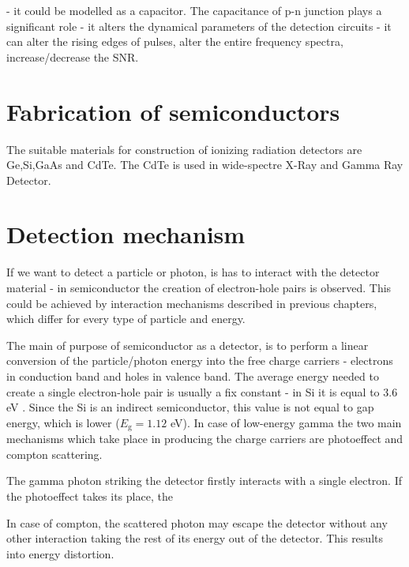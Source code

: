 - it could be modelled as a capacitor. The capacitance of p-n junction plays a significant role - it alters the dynamical parameters of the detection circuits - it can alter the rising edges of pulses, alter the entire frequency spectra, increase/decrease the SNR.

\section{Fabrication of semiconductors}



The suitable materials for construction of ionizing radiation detectors are Ge,Si,GaAs and CdTe. The CdTe is used in wide-spectre X-Ray and Gamma Ray Detector.

\section{Detection mechanism}

\par
If we want to detect a particle or photon, is has to interact with the detector material - in semiconductor the creation of electron-hole pairs is observed. This could be achieved by interaction mechanisms described in previous chapters, which differ for every type of particle and energy. 

\par
The main of purpose of semiconductor as a detector, is to perform a linear conversion of the particle/photon energy into the free charge carriers - electrons in conduction band and holes in valence band. The average energy needed to create a single electron-hole pair is usually a fix constant - in Si it is equal to 3.6 eV \cite{Lutz_2007}. Since the Si is an indirect semiconductor, this value is not equal to gap energy, which is lower ($E_{\textrm{g}} = 1.12$ eV). In case of low-energy gamma the two main mechanisms which take place in producing the charge carriers are photoeffect and compton scattering. 

\par
The gamma photon striking the detector firstly interacts with a single electron. If the photoeffect takes its place, the






 In case of compton, the scattered photon may escape the detector without any other interaction taking the rest of its energy out of the detector. This results into energy distortion.  

